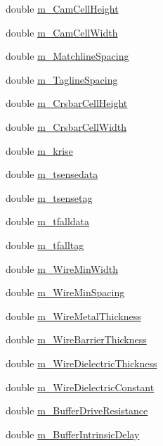 \begin{DoxyCompactItemize}
double \hyperlink{classTechParameter_af3de3fdbefbd56ac9b77b41d96b12696}{m\_\-CamCellHeight}
\item 
double \hyperlink{classTechParameter_abe9ef02a833ff8a610d32ff65bb16b15}{m\_\-CamCellWidth}
\item 
double \hyperlink{classTechParameter_a492ea5a27b76ff2cecf6ca64bed61b24}{m\_\-MatchlineSpacing}
\item 
double \hyperlink{classTechParameter_a1fcf9606c0d8d349f86a731fbf533fd9}{m\_\-TaglineSpacing}
\item 
double \hyperlink{classTechParameter_a697382cb8b6a66aeb28039934c55d1df}{m\_\-CrsbarCellHeight}
\item 
double \hyperlink{classTechParameter_a19d0da0047b4c58530dc87c0572209cb}{m\_\-CrsbarCellWidth}
\item 
double \hyperlink{classTechParameter_a436c3a921ec945692e7d9d6c2cc4deea}{m\_\-krise}
\item 
double \hyperlink{classTechParameter_abd5eb664420abb2222cad3b0108a9328}{m\_\-tsensedata}
\item 
double \hyperlink{classTechParameter_a2c1d6b42d788a679e93811ca1e48a43f}{m\_\-tsensetag}
\item 
double \hyperlink{classTechParameter_a1444e096a952a72e9b641b9345ee94f3}{m\_\-tfalldata}
\item 
double \hyperlink{classTechParameter_a19abe4ae162c689f113029f00d441418}{m\_\-tfalltag}
\item 
double \hyperlink{classTechParameter_a019aa4e7dc153f6a1b733eec3e6e0e75}{m\_\-WireMinWidth}
\item 
double \hyperlink{classTechParameter_a8c7fee1b4388f9f5134aed6bcf7d2b15}{m\_\-WireMinSpacing}
\item 
double \hyperlink{classTechParameter_afc1b56256ba17e03023812d498d516fc}{m\_\-WireMetalThickness}
\item 
double \hyperlink{classTechParameter_a79e3cb885edcb78c5ea30d19d3c1f76d}{m\_\-WireBarrierThickness}
\item 
double \hyperlink{classTechParameter_a92ccfbf663b82b45bd5a0583d345451a}{m\_\-WireDielectricThickness}
\item 
double \hyperlink{classTechParameter_aec230ffe789a9e02d10aafdcd01ea204}{m\_\-WireDielectricConstant}
\item 
double \hyperlink{classTechParameter_af3ebc1d0dc4e55c799aa15ef006cc403}{m\_\-BufferDriveResistance}
\item 
double \hyperlink{classTechParameter_a7480cdd69fc02553b7297349566e775c}{m\_\-BufferIntrinsicDelay}

\end{DoxyCompactItemize}
